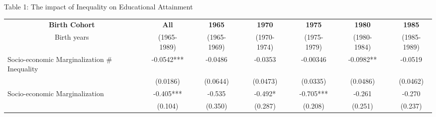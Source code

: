 \documentclass{beamer}
\begin{document}
\begin{frame}[label=main6]{\scriptsize Table 1: The impact of Inequality on Educational Attainment \hyperlink{Robustness}{\beamerbutton {\textcolor{red}{Robustness Checks}}}}
\begin{table}[htbp]
  \centering
\vspace*{-2mm}
  \begin{adjustbox}{max width=\textwidth}
    \begin{tabular}{lllllllllllll}
    \toprule
    \multicolumn{1}{c}{\textbf{Birth Cohort}} &       & \multicolumn{1}{c}{\textbf{All}} &       & \multicolumn{1}{c}{\textbf{1965}} &       & \multicolumn{1}{c}{\textbf{1970}} &       & \multicolumn{1}{c}{\textbf{1975}} &       & \multicolumn{1}{c}{\textbf{1980}} &       & \multicolumn{1}{c}{\textbf{1985}} \\
    \multicolumn{1}{c}{Birth years} &       & \multicolumn{1}{c}{(1965-1989)} &       & \multicolumn{1}{c}{(1965-1969)} &       & \multicolumn{1}{c}{(1970-1974)} &       & \multicolumn{1}{c}{(1975-1979)} &       & \multicolumn{1}{c}{(1980-1984)} &       & \multicolumn{1}{c}{(1985-1989)} \\
\cmidrule{3-3}\cmidrule{5-5}\cmidrule{7-7}\cmidrule{9-9}\cmidrule{11-11}\cmidrule{13-13}    Socio-economic Marginalization \# Inequality &       & \multicolumn{1}{c}{-0.0542***} &       & \multicolumn{1}{c}{-0.0486} &       & \multicolumn{1}{c}{-0.0353} &       & \multicolumn{1}{c}{-0.00346} &       & \multicolumn{1}{c}{-0.0982**} &       & \multicolumn{1}{c}{-0.0519} \\
          &       & \multicolumn{1}{c}{(0.0186)} &       & \multicolumn{1}{c}{(0.0644)} &       & \multicolumn{1}{c}{(0.0473)} &       & \multicolumn{1}{c}{(0.0335)} &       & \multicolumn{1}{c}{(0.0486)} &       & \multicolumn{1}{c}{(0.0462)} \\
    Socio-economic Marginalization &       & \multicolumn{1}{c}{-0.405***} &       & \multicolumn{1}{c}{-0.535} &       & \multicolumn{1}{c}{-0.492*} &       & \multicolumn{1}{c}{-0.705***} &       & \multicolumn{1}{c}{-0.261} &       & \multicolumn{1}{c}{-0.270} \\
          &       & \multicolumn{1}{c}{(0.104)} &       & \multicolumn{1}{c}{(0.350)} &       & \multicolumn{1}{c}{(0.287)} &       & \multicolumn{1}{c}{(0.208)} &       & \multicolumn{1}{c}{(0.251)} &       & \multicolumn{1}{c}{(0.237)} \\

\end{tabular}
\end{adjustbox}
\end{table}
\end{frame}
\end{document}
